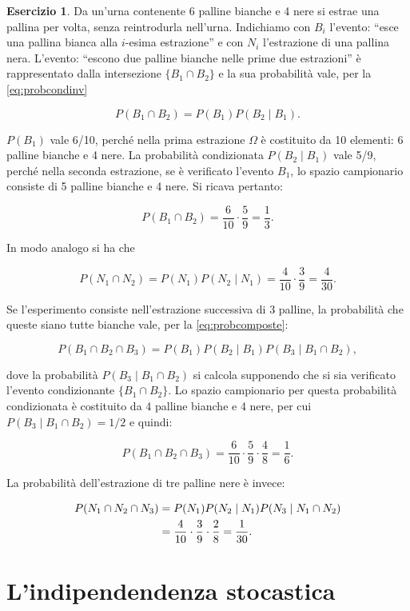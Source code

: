 \documentclass[
  11pt,
]{krantz}
\theoremstyle{definition}
\theoremstyle{definition}
\theoremstyle{definition}
\newtheorem{exercise}{Esercizio}[chapter]
\theoremstyle{definition}
\theoremstyle{remark}
\begin{document}
\begin{exercise}
Da un'urna contenente 6 palline bianche e 4 nere si estrae una pallina per volta, senza reintrodurla nell'urna. Indichiamo con \(B_i\) l'evento: ``esce una pallina bianca alla \(i\)-esima estrazione'' e con \(N_i\) l'estrazione di una pallina nera. L'evento: ``escono due palline bianche nelle prime due estrazioni'' è rappresentato dalla intersezione \(\{B_1 \cap B_2\}\) e la sua probabilità vale, per la \eqref{eq:probcondinv}

\[
P(B_1 \cap B_2) = P(B_1)P(B_2 \mid B_1).
\]

\(P(B_1)\) vale 6/10, perché nella prima estrazione \(\Omega\) è costituito da 10 elementi: 6 palline bianche e 4 nere. La probabilità condizionata \(P(B_2 \mid B_1)\) vale 5/9, perché nella seconda estrazione, se è verificato l'evento \(B_1\), lo spazio campionario consiste di 5 palline bianche e 4 nere. Si ricava pertanto:

\[
P(B_1 \cap B_2) = \frac{6}{10} \cdot \frac{5}{9} = \frac{1}{3}.
\]

In modo analogo si ha che

\[
P(N_1 \cap N_2) = P(N_1)P(N_2 \mid N_1) = \frac{4}{10} \cdot \frac{3}{9} = \frac{4}{30}.
\]

Se l'esperimento consiste nell'estrazione successiva di 3 palline, la probabilità che queste siano tutte bianche vale, per la \eqref{eq:probcomposte}:

\[
P(B_1 \cap B_2 \cap B_3)=P(B_1)P(B_2 \mid B_1)P(B_3 \mid B_1 \cap B_2),
\]

dove la probabilità \(P(B_3 \mid B_1 \cap B_2)\) si calcola supponendo che si sia verificato l'evento condizionante \(\{B_1 \cap B_2\}\). Lo spazio campionario per questa probabilità condizionata è costituito da 4 palline bianche e 4 nere, per cui \(P(B_3 \mid B_1 \cap B_2) = 1/2\) e quindi:

\[
P (B_1 \cap B_2 \cap B_3) = \frac{6}{10}\cdot\frac{5}{9} \cdot\frac{4}{8}  = \frac{1}{6}.
\]

La probabilità dell'estrazione di tre palline nere è invece:

\[
\begin{aligned}
P(N_1 \cap N_2 \cap N_3) &= P(N_1)P(N_2 \mid N_1)P(N_3 \mid N_1 \cap N_2)\notag\\ 
&= \frac{4}{10} \cdot \frac{3}{9} \cdot \frac{2}{8} = \frac{1}{30}.\notag
\end{aligned}
\]
\end{exercise}

\hypertarget{lindipendendenza-stocastica}{%
\section{L'indipendendenza stocastica}\label{lindipendendenza-stocastica}}
\end{document}
